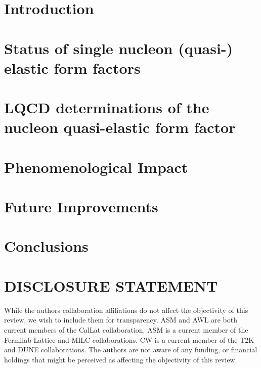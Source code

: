 \documentclass{ar-1col}
\begin{document}
\maketitle

\tableofcontents


\section{Introduction\label{sec:intro}}



\section{Status of single nucleon (quasi-) elastic form factors\label{sec:sof}}


\section{LQCD determinations of the nucleon quasi-elastic form factor\label{sec:lqcd}}



\section{Phenomenological Impact\label{sec:impact}}



\section{Future Improvements\label{sec:future}}



\section{Conclusions\label{sec:conclusions}}



\section*{DISCLOSURE STATEMENT}
While the authors collaboration affiliations do not affect the objectivity of this review, we wish to include them for transparency. ASM and AWL are both current members of the CalLat collaboration. ASM is a current member of the Fermilab Lattice and MILC collaborations. CW is a current member of the T2K and DUNE collaborations.
The authors are not aware of any funding, or financial holdings that might be perceived as affecting the objectivity of this review.
\end{document}
